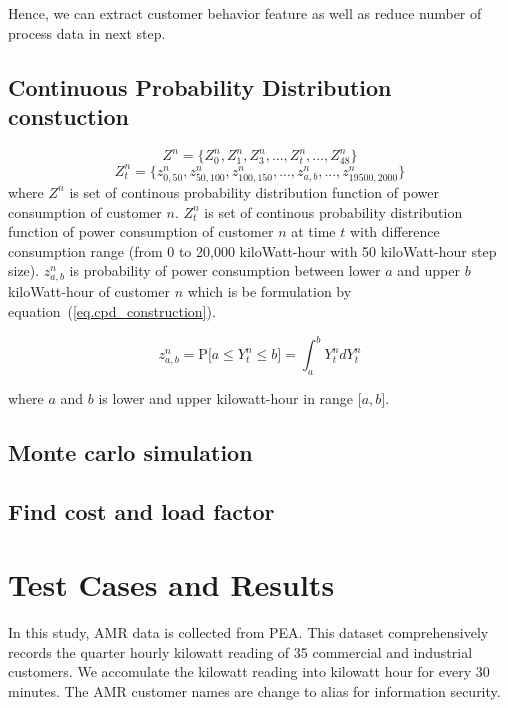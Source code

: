 \documentclass[conference]{IEEEtran}
\begin{document}
Hence, we can extract customer behavior feature as well as reduce number of process data in next step.

\subsection{Continuous Probability Distribution constuction}

\begin{equation}
Z^{n}=\big\{ Z_{0}^{n}, Z_{1}^{n}, Z_{3}^{n}, ..., Z_{t}^{n}, ..., Z_{48}^{n} \big\}
\label{eq.CPD_customer}
\end{equation}
\begin{equation}
Z_{t}^{n}=\big\{ z_{0,50}^{n}, z_{50,100}^{n}, z_{100,150}^{n}, ..., z_{a,b}^{n}, ..., z_{19500,2000}^{n} \big\}
\label{eq.CPD_customer_at_t}
\end{equation}
where $Z^{n}$ is set of continous probability distribution function of power consumption of customer $n$.
$Z_{t}^{n}$ is set of continous probability distribution function of power consumption of customer $n$ at time $t$ with difference consumption range (from 0 to 20,000 kiloWatt-hour with 50 kiloWatt-hour step size).
$z_{a,b}^{n}$ is probability of power consumption between lower $a$ and upper $b$ kiloWatt-hour of customer $n$ which is be formulation by equation~(\ref{eq.cpd_construction}).


\begin{equation}
z_{a,b}^{n}=\text{P}\big[ a \le Y_{t}^{n} \le b \big] = \int_{a}^{b} Y_{t}^{n}dY_{t}^{n}
\label{eq.cpd_construction}
\end{equation}

where $a$ and $b$ is lower and upper kilowatt-hour in range $\big[ a,b \big]$.

\subsection{Monte carlo simulation}


\subsection{Find cost and load factor}

\section{Test Cases and Results}
In this study, AMR data is collected from PEA. This dataset comprehensively records the quarter hourly kilowatt reading of 35 commercial and industrial customers. We accomulate the kilowatt reading into kilowatt hour for every 30 minutes. The AMR customer names are change to alias for information security.
\end{document}
